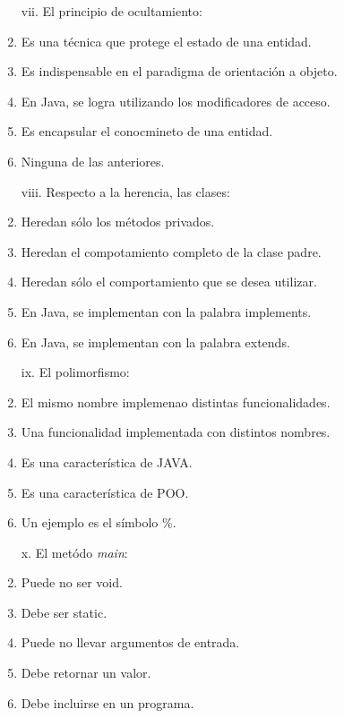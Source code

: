 \documentclass[10pt]{article}
\begin{document}
{\begin{enumerate}
\begin{multicols}{2}
    \begin{enumerate}[label=(\alph*)]
        \item[vii.] El principio de ocultamiento: 
        \item Es una t\'ecnica que protege el estado de una entidad.
        \item Es indispensable en el paradigma de orientaci\'on a objeto.
        \item En Java, se logra utilizando los modificadores de acceso.
        \item Es encapsular el conocmineto de una entidad.
        \item Ninguna de las anteriores.
    \end{enumerate}

    \begin{enumerate}[label=(\alph*)]
        \item[viii.] Respecto a la herencia, las clases:
        \item Heredan s\'olo los m\'etodos privados.
        \item Heredan el compotamiento completo de la clase padre.
        \item Heredan s\'olo el comportamiento que se desea utilizar.
        \item En Java, se implementan con la palabra implements.
        \item En Java, se implementan con la palabra extends.
    \end{enumerate}

    \begin{enumerate}[label=(\alph*)]
        \item[ix.] El polimorfismo: 
        \item El mismo nombre implemenao distintas funcionalidades.
        \item Una funcionalidad implementada con distintos nombres.
        \item Es una caracter\'istica de JAVA.
        \item Es una caracter\'istica de POO.
        \item Un ejemplo es el s\'imbolo \%.
    \end{enumerate}

    \begin{enumerate}[label=(\alph*)]
        \item[x.] El met\'odo \emph{main}:
        \item Puede no ser void.
        \item Debe ser static.
        \item Puede no llevar argumentos de entrada.
        \item Debe retornar un valor.
        \item Debe incluirse en un programa.
    \end{enumerate}


\end{multicols}
\end{enumerate}}
\end{document}
